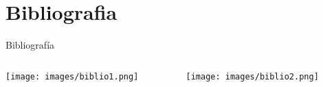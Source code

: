 \documentclass{bredelebeamer}
\begin{document}



\section{Bibliografia}

\begin{frame}{Bibliografía}
\begin{columns}
\begin{column}{0.5\textwidth}
\begin{center}
\texttt{[image: images/biblio1.png]}
\end{center}
\end{column}
\begin{column}{0.5\textwidth}
\begin{center}
\texttt{[image: images/biblio2.png]}
\end{center}
\end{column}
\end{columns}
\end{frame}
\end{document}
